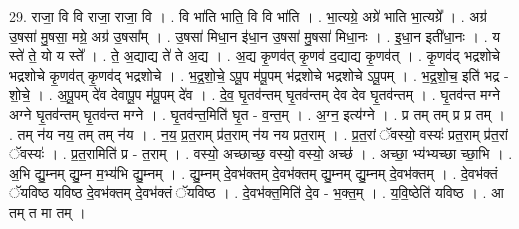 \documentclass[17pt]{extarticle}
\begin{document}
29. राजा॒ वि वि राजा॒ राजा॒ वि । . वि भा॑ति भाति॒ वि वि भा॑ति । . भा॒त्यग्रे॒ अग्रे॑ भाति भा॒त्यग्रे᳚ । . अग्र॑ उ॒षसा॑ मु॒षसा॒ मग्रे॒ अग्र॑ उ॒षसा᳚म् । . उ॒षसा॑ मिधा॒न इ॑धा॒न उ॒षसा॑ मु॒षसा॑ मिधा॒नः । . इ॒धा॒न इती॑धा॒नः । . य स्ते॑ ते॒ यो य स्ते᳚ । . ते॒ अ॒द्याद्य ते॑ ते अ॒द्य । . अ॒द्य कृ॒णव॑त् कृ॒णव॑ द॒द्याद्य कृ॒णव॑त् । . कृ॒णव॑द् भद्रशोचे भद्रशोचे कृ॒णव॑त् कृ॒णव॑द् भद्रशोचे । . भ॒द्र॒शो॒चे॒ ऽपू॒प म॑पू॒पम् भ॑द्रशोचे भद्रशोचे ऽपू॒पम् । . भ॒द्र॒शो॒च॒ इति॑ भद्र - शो॒चे॒ । . अ॒पू॒पम् दे॑व देवापू॒प म॑पू॒पम् दे॑व । . दे॒व॒ घृ॒तव॑न्तम् घृ॒तव॑न्तम् देव देव घृ॒तव॑न्तम् । . घृ॒तव॑न्त मग्ने अग्ने घृ॒तव॑न्तम् घृ॒तव॑न्त मग्ने । . घृ॒तव॑न्त॒मिति॑ घृ॒त - व॒न्त॒म् । . अ॒ग्न॒ इत्य॑ग्ने । . प्र तम् तम् प्र प्र तम् । . तम् न॑य नय॒ तम् तम् न॑य । . न॒य॒ प्र॒त॒राम् प्र॑त॒राम् न॑य नय प्रत॒राम् । . प्र॒त॒रां ॅवस्यो॒ वस्यः॑ प्रत॒राम् प्र॑त॒रां ॅवस्यः॑ । . प्र॒त॒रामिति॑ प्र - त॒राम् । . वस्यो॒ अच्छाच्छ॒ वस्यो॒ वस्यो॒ अच्छ॑ । . अच्छा॒ भ्य॑भ्यच्छा च्छा॒भि । . अ॒भि द्यु॒म्नम् द्यु॒म्न म॒भ्य॑भि द्यु॒म्नम् । . द्यु॒म्नम् दे॒वभ॑क्तम् दे॒वभ॑क्तम् द्यु॒म्नम् द्यु॒म्नम् दे॒वभ॑क्तम् । . दे॒वभ॑क्तं ॅयविष्ठ यविष्ठ दे॒वभ॑क्तम् दे॒वभ॑क्तं ॅयविष्ठ । . दे॒वभ॑क्त॒मिति॑ दे॒व - भ॒क्त॒म् । . य॒वि॒ष्ठेति॑ यविष्ठ । . आ तम् त मा तम् । \newline
\end{document}
